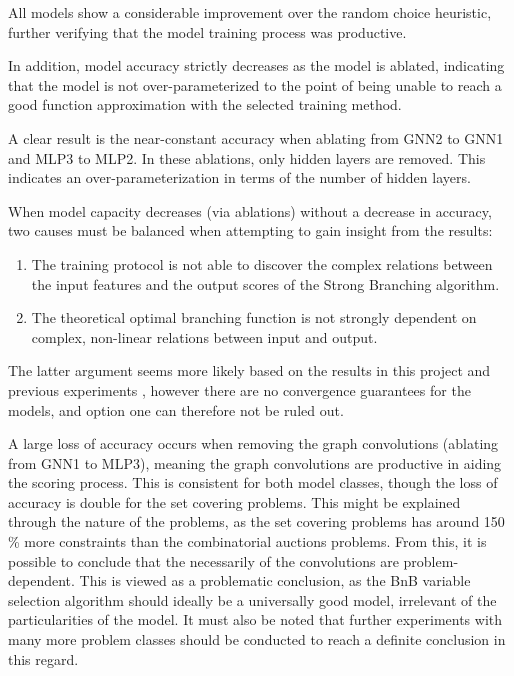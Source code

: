 All models show a considerable improvement over the random choice heuristic, further verifying that the model training process was productive. 

In addition, model accuracy strictly decreases as the model is ablated, indicating that the model is not over-parameterized to the point of being unable to reach a good function approximation with the selected training method. 

A clear result is the near-constant accuracy when ablating from GNN2 to GNN1 and MLP3 to MLP2. In these ablations, only hidden layers are removed. This indicates an over-parameterization in terms of the number of hidden layers.


When model capacity decreases (via ablations) without a decrease in accuracy, two causes must be balanced when attempting to gain insight from the results: 
\begin{enumerate}[label=(\roman*)]
    \item The training protocol is not able to discover the complex relations between the input features and the output scores of the Strong Branching algorithm.
    \item The theoretical optimal branching function is not strongly dependent on complex, non-linear relations between input and output.
\end{enumerate}
The latter argument seems more likely based on the results in this project and previous experiments \cite{gupta2020hybrid} \cite{gasse2019exact}, however there are no convergence guarantees for the models, and option one can therefore not be ruled out.





A large loss of accuracy occurs when removing the graph convolutions (ablating from GNN1 to MLP3), meaning the graph convolutions are productive in aiding the scoring process. This is consistent for both model classes, though the loss of accuracy is double for the set covering problems. This might be explained through the nature of the problems, as the set covering problems has around 150 \% more constraints than the combinatorial auctions problems. From this, it is possible to conclude that the necessarily of the convolutions are problem-dependent. This is viewed as a problematic conclusion, as the \gls{BnB} variable selection algorithm should ideally be a universally good model, irrelevant of the particularities of the model. It must also be noted that further experiments with many more problem classes should be conducted to reach a definite conclusion in this regard. 

